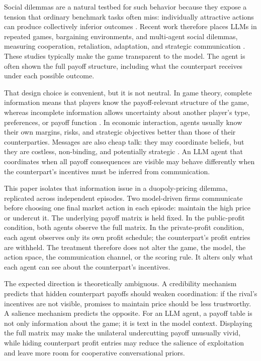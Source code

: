 \documentclass[11pt,a4paper]{article}
\begin{document}
Social dilemmas are a natural testbed for such behavior because they expose a tension that ordinary benchmark tasks often miss: individually attractive actions can produce collectively inferior outcomes \cite{luce1957games,rapoport1965prisoners}. Recent work therefore places LLMs in repeated games, bargaining environments, and multi-agent social dilemmas, measuring cooperation, retaliation, adaptation, and strategic communication \cite{fontana2024nicer,akata2025playing,han2024static,willis2025systems}. These studies typically make the game transparent to the model. The agent is often shown the full payoff structure, including what the counterpart receives under each possible outcome.

That design choice is convenient, but it is not neutral. In game theory, complete information means that players know the payoff-relevant structure of the game, whereas incomplete information allows uncertainty about another player's type, preferences, or payoff function \cite{harsanyi1967games,aumann1995repeated}. In economic interaction, agents usually know their own margins, risks, and strategic objectives better than those of their counterparties. Messages are also cheap talk: they may coordinate beliefs, but they are costless, non-binding, and potentially strategic \cite{crawford1982strategic,farrell1996cheap}. An LLM agent that coordinates when all payoff consequences are visible may behave differently when the counterpart's incentives must be inferred from communication.

This paper isolates that information issue in a duopoly-pricing dilemma, replicated across independent episodes. Two model-driven firms communicate before choosing one final market action in each episode: maintain the high price or undercut it. The underlying payoff matrix is held fixed. In the public-profit condition, both agents observe the full matrix. In the private-profit condition, each agent observes only its own profit schedule; the counterpart's profit entries are withheld. The treatment therefore does not alter the game, the model, the action space, the communication channel, or the scoring rule. It alters only what each agent can see about the counterpart's incentives.

The expected direction is theoretically ambiguous. A credibility mechanism predicts that hidden counterpart payoffs should weaken coordination: if the rival's incentives are not visible, promises to maintain price should be less trustworthy. A salience mechanism predicts the opposite. For an LLM agent, a payoff table is not only information about the game; it is text in the model context. Displaying the full matrix may make the unilateral undercutting payoff unusually vivid, while hiding counterpart profit entries may reduce the salience of exploitation and leave more room for cooperative conversational priors.
\end{document}
